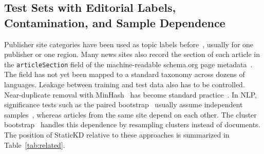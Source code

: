 \documentclass[journal]{IEEEtran}
\begin{document}
\subsection{Test Sets with Editorial Labels, Contamination, and Sample Dependence}
Publisher site categories have been used as topic labels before~\cite{mirashi2023indicnews}, usually for one publisher or one region. Many news sites also record the section of each article in the \texttt{articleSection} field of the machine-readable schema.org page metadata~\cite{guha2016schema}. The field has not yet been mapped to a standard taxonomy across dozens of languages. Leakage between training and test data also has to be controlled. Near-duplicate removal with MinHash~\cite{broder1997resemblance} has become standard practice~\cite{lee2022dedup}. In NLP, significance tests such as the paired bootstrap~\cite{koehn2004significance} usually assume independent samples~\cite{dror2018hitchhiker}, whereas articles from the same site depend on each other. The cluster bootstrap~\cite{field2007bootstrapping} handles this dependence by resampling clusters instead of documents. The position of StaticKD relative to these approaches is summarized in Table~\ref{tab:related}.

\begin{table}[!t]
\caption{Position of StaticKD Relative to Related Approaches}
\label{tab:related}
\centering
\footnotesize
\setlength{\tabcolsep}{4pt}
\end{table}
\end{document}
